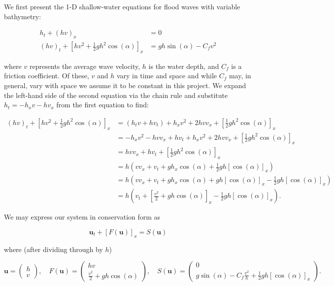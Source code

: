 We first present the 1-D shallow-water equations for flood waves with variable bathymetry\cite{whitham1999_ch3}:

\begin{align*}
    h_t + (h v)_x &= 0 \\
    (h v)_t + \left[ hv^2 + \frac{1}{2} g h^2 \cos{(\alpha)} \right]_x &= g h \sin{(\alpha)} - C_f v^2
\end{align*}

where $v$ represents the average wave velocity, $h$ is the water depth, and $C_f$ is a friction
coefficient. Of these, $v$ and $h$ vary in time and space and while $C_f$ may, in general, vary with space we assume
it to be constant in this project. We expand the left-hand side of the second equation via the chain rule and 
substitute $h_t = -h_x v - h v_x$ from the first equation to find: 

\begin{align*}
    (h v)_t + \left[ hv^2 + \frac{1}{2} g h^2 \cos{(\alpha)} \right]_x 
        &= \left( h_t v + h v_t \right) + h_x v^2 + 2 h v v_x + \left[ \frac{1}{2} g h^2 \cos{(\alpha)} \right]_x \\
        &= -h_x v^2 - h v v_x + h v_t + h_x v^2 + 2 h v v_x + \left[ \frac{1}{2} g h^2 \cos{(\alpha)} \right]_x \\
        &=  h v v_x + h v_t + \left[ \frac{1}{2} g h^2 \cos{(\alpha)} \right]_x \\
        &=  h \left( v v_x + v_t + g h_x \cos{(\alpha)} + \frac{1}{2} g h [\cos{(\alpha)}]_x \right) \\
        &=  h \left( v v_x + v_t + g h_x \cos{(\alpha)} + g h [\cos{(\alpha)}]_x - \frac{1}{2} g h [\cos{(\alpha)}]_x \right) \\
        &=  h \left( v_t + \left[ \frac{v^2}{2} + g h \cos{(\alpha)} \right]_x - \frac{1}{2} g h [\cos{(\alpha)}]_x \right).
\end{align*}

\pagebreak
We may express our system in conservation form as

$$
    \textbf{u}_t + \left[ F(\textbf{u}) \right]_x = S(\textbf{u})
$$

where (after dividing through by $h$)

$$
\textbf{u} = \begin{pmatrix}
    h \\
    v
\end{pmatrix}, \quad F(\textbf{u}) = \begin{pmatrix}
    hv \\
    \frac{v^2}{2} + g h \cos{(\alpha)}
\end{pmatrix}, \quad S(\textbf{u}) = \begin{pmatrix}
    0 \\
    g \sin{(\alpha)} - C_f \frac{v^2}{h} + \frac{1}{2} g h [\cos{(\alpha)}]_x
\end{pmatrix}.
$$

